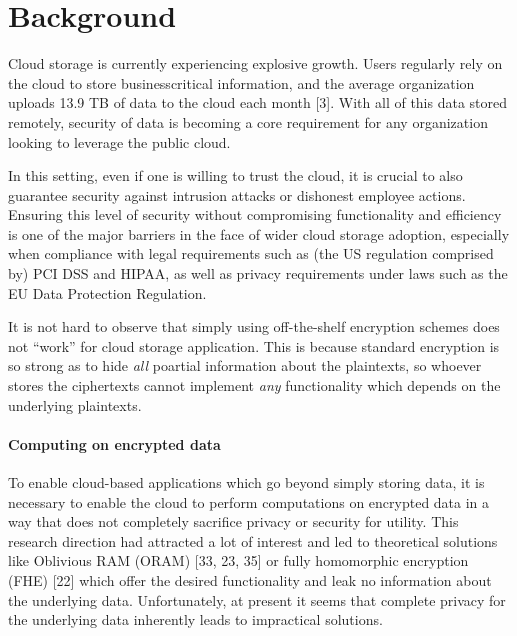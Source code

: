 
\section{Background}
\label{sec:prop_bg}

Cloud storage is currently experiencing explosive growth. Users regularly rely on the cloud to store businesscritical
information, and the average organization uploads 13.9 TB of data to the cloud each month [3].
With all of this data stored remotely, security of data is becoming a core requirement for any organization looking to leverage the public cloud.  

In this setting, even if one is willing to trust the cloud, it is crucial to also guarantee security against intrusion attacks or dishonest employee actions. 
Ensuring this level of security without compromising functionality and efficiency is one of the major barriers in the 
face of wider cloud storage adoption, especially when compliance with legal requirements such as (the US regulation comprised by) PCI DSS and HIPAA, as well as privacy requirements under laws such as the EU Data Protection Regulation. 

It is not hard to observe that simply using off-the-shelf encryption schemes does not “work” for cloud
storage application. This is because standard encryption is so strong as to hide \emph{all} poartial information about the plaintexts, so whoever stores the ciphertexts cannot implement \emph{any} functionality  which depends on the underlying plaintexts. 

\paragraph{Computing on encrypted data}
To enable cloud-based applications which go beyond simply storing data, it is necessary to enable the cloud to perform computations on encrypted data in a way that does not completely sacrifice privacy or security for utility.
This research direction had attracted a lot of interest and led to theoretical solutions like Oblivious RAM (ORAM) [33, 23, 35] or fully homomorphic encryption (FHE) [22] which offer the desired functionality and leak no information about the underlying data. 
Unfortunately, at present it seems that complete privacy for the underlying data inherently leads to impractical solutions. 

